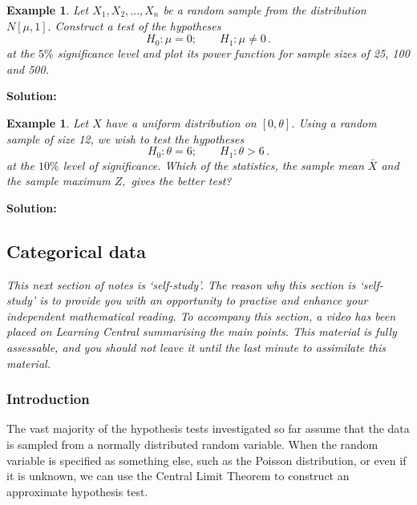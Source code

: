 \documentclass[12pt]{article}
\newtheorem{example}[theorem]{Example}
\begin{document}
\begin{example}
Let $X_{1},X_{2},\ldots,X_{n}$ be a random sample from the distribution $N[\mu,1].$ Construct a test of the hypotheses $$
H_{0}: \mu=0; \qquad H_{1}: \mu \neq 0\,.
$$
at the $5\%$ significance level and plot its power function for sample sizes of 25, 100 and 500.
\end{example}

\begin{mdframed}
\bf{Solution:}
\textcolor[rgb]{1.00,1.00,1.00}{\lipsum[1-6]}
\end{mdframed}

\begin{example}
Let $X$ have a uniform distribution on $[0,\theta]$. Using a random sample of size 12, we wish to test the hypotheses
$$
H_{0}: \theta=6; \qquad H_{1}: \theta>6\,.
$$
at the $10\%$ level of significance. Which of the statistics, the sample mean $\bar{X}$ and the sample maximum $Z,$ gives the better test?
\end{example}
\begin{mdframed}
\bf{Solution:}
\textcolor[rgb]{1.00,1.00,1.00}{\lipsum[1-7]}
\end{mdframed}




\subsection{Categorical data}
\begin{mdframed}
{\it This next section of notes is `self-study'. The reason why this section is `self-study' is to provide you with an opportunity to practise and enhance your independent mathematical reading. To accompany this section, a video has been placed on Learning Central summarising the main points. This material is fully assessable, and you should not leave it until the last minute to assimilate this material. }
\end{mdframed}

\subsubsection{Introduction}

The vast majority of the hypothesis tests investigated so far assume that the data is sampled from a normally distributed random variable. When the random variable is specified as something else, such as the Poisson distribution, or even if it is unknown, we can use the Central Limit Theorem to construct an approximate hypothesis test.
\end{document}

